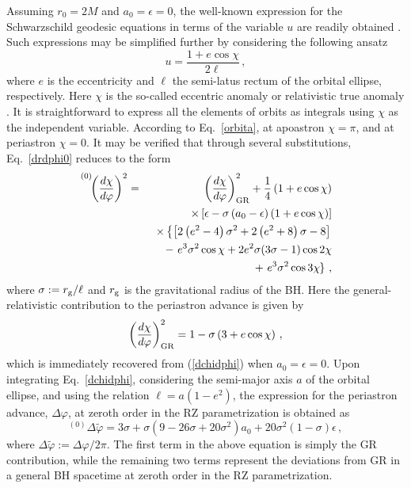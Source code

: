 \documentclass[a4paper,aps,twocolumn,showpacs,showkeys,nofootinbib,preprintnumbers,superscriptaddress,amsmath,amssymb,amsfonts]{revtex4-1}
\begin{document}
Assuming $r_0 = 2M$ and
$a_0=\epsilon=0$, the well-known expression for the
Schwarzschild geodesic equations in terms of the variable $u$
are readily obtained
\cite{Landau-Lifshitz1, Roy2005}. Such expressions may be simplified
further by considering the following ansatz
%
\begin{equation} 
\label{orbita}
u = \frac{1 + e\cos \chi}{2\ell} \,,
\end{equation} 
%
where $e$ is the eccentricity and $\ell$ the {semi-latus rectum} of the
orbital ellipse, respectively. 
Here $\chi$ is the so-called {eccentric
  anomaly} or relativistic true anomaly
\cite{Darwin1961,Geisler1963,Chandrasekhar83, Frolov98, Maggiore2007}.
It is straightforward to express all the elements of orbits as integrals using
$\chi$ as the independent variable. According to Eq.~\eqref{orbita}, at
apoastron $\chi=\pi$, and at periastron $\chi=0$. It may be verified that
through several substitutions, Eq.~\eqref{drdphi0} reduces to the form
%
\begin{eqnarray} 
\label{dchidphi}
\hspace{-7.5mm}{\phantom{\left(\frac{1}{1}\right)}}^{(0)}
            \!\! \left(\frac{d\chi}{d\varphi}\right)^2&=&
            \left(\frac{d\chi}{d\varphi}\right)^2_{\rm GR} + \frac{1}{4}
            \left(1+e \cos\chi\right) \nonumber \\&&
            \times \left[ \epsilon - \sigma\left(a_{0}-\epsilon\right)\left(1+e \cos\chi\right) \right]
            \nonumber \\ &&
            \times \left\{ \left[2\left(e^2-4\right) \sigma^2+2\left(e^2+8\right)\sigma-8\right] \right. 
            \nonumber \\&&
           \ \ \ \ - \ e^3 \sigma^2 \cos\chi + 2e^2 \sigma(3\sigma-1) \cos2 \chi \nonumber \\&&
           \ \ \ \ + \ e^3 \sigma^2  \cos3\chi \left. \! \! \right\} \,,
\end{eqnarray}
%
where $\sigma:= r_{\rm g}/\ell$ and $r_{\rm g}$ is the gravitational
radius of the BH.
Here the general-relativistic contribution to the periastron
advance is given by \cite{Chandrasekhar83} 
%
\begin{equation} 
\left(\frac{d\chi}{d\varphi}\right)^2_{\rm GR} = 1 - \sigma \left(3+e\cos\chi\right) \,,
\end{equation}
%
which is immediately recovered from (\ref{dchidphi}) when
$a_0=\epsilon=0$. Upon integrating Eq.~\eqref{dchidphi}, considering the
semi-major axis $a$ of the orbital ellipse, and using the relation
$\ell=a(1-e^2)$, the expression for the periastron advance, $\Delta
\varphi$, at zeroth order in the RZ parametrization is obtained as
%
\begin{equation} 
\label{Prec0}
{}^{(0)} \Delta \widetilde{\varphi} = 
{3 \sigma}
+ 
\sigma \left(9 - 26 \sigma+20 \sigma^2 \right) a_0 +
20\sigma^{2} \left( 1 - \sigma \right) \epsilon \,,
\end{equation}
%
where $\Delta \widetilde{\varphi} := \Delta \varphi/2\pi$. The first
term in the above equation is simply the GR contribution, while the
remaining two terms represent the deviations from GR in a general BH spacetime
at zeroth order in the RZ parametrization.
 
\end{document}
